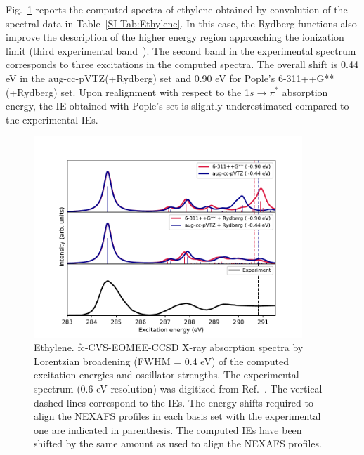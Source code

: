 \documentclass[journal=jctcce,manuscript=article]{achemso}
\begin{document}
\clearpage
Fig.~\ref{fgr:ethylene} reports the computed spectra of ethylene
obtained by convolution of the spectral data in Table~\ref{SI-Tab:Ethylene}. In this case, the Rydberg functions also improve the description of the higher energy region approaching the ionization limit (third experimental band~\cite{NEXAFS_C2H4_CH2CHF_Exp}). 
The second band in the experimental spectrum corresponds to three excitations in the computed spectra.
The overall shift is 0.44 eV in the aug-cc-pVTZ(+Rydberg) set and 0.90 eV for Pople's 6-311++G**(+Rydberg) set. Upon realignment
with respect to the 1$s\to \pi^\ast$ absorption energy, the IE obtained with Pople's set is slightly underestimated compared to the experimental IEs.

\begin{figure}
  \includegraphics[width=0.9\textwidth]{Spectra/C2H4.pdf}
  \caption{Ethylene. fc-CVS-EOMEE-CCSD X-ray absorption spectra by  Lorentzian broadening (FWHM = 0.4 eV) of the computed excitation energies and oscillator strengths. The  experimental spectrum (0.6 eV resolution) was digitized from Ref.~. The vertical dashed lines correspond to the IEs.
The energy shifts 
required to align the NEXAFS profiles in each basis set with the
experimental one are indicated in parenthesis. The computed IEs have been shifted by the same amount as used to align the NEXAFS profiles.
\label{fgr:ethylene}}
\end{figure}
\end{document}
